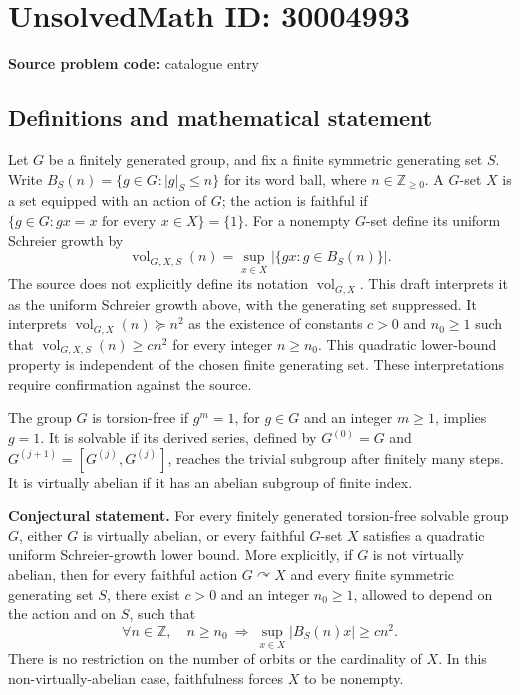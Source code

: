 \documentclass[11pt]{article}
\newcommand{\Z}{\mathbb{Z}}
\begin{document}
\section*{UnsolvedMath ID: 30004993}
\textbf{Source problem code:} catalogue entry
\subsection{Definitions and mathematical statement}
Let \(G\) be a finitely generated group, and fix a finite symmetric generating set \(S\). Write \(B_S(n)=\{g\in G:|g|_S\leq n\}\) for its word ball, where \(n\in\Z_{\geq 0}\). A \(G\)-set \(X\) is a set equipped with an action of \(G\); the action is faithful if \(\{g\in G:gx=x\text{ for every }x\in X\}=\{1\}\). For a nonempty \(G\)-set define its uniform Schreier growth by
\[
\operatorname{vol}_{G,X,S}(n)=\sup_{x\in X}\bigl|\{gx:g\in B_S(n)\}\bigr|.
\]
The source does not explicitly define its notation \(\operatorname{vol}_{G,X}\). This draft interprets it as the uniform Schreier growth above, with the generating set suppressed. It interprets \(\operatorname{vol}_{G,X}(n)\succeq n^2\) as the existence of constants \(c>0\) and \(n_0\geq 1\) such that \(\operatorname{vol}_{G,X,S}(n)\geq cn^2\) for every integer \(n\geq n_0\). This quadratic lower-bound property is independent of the chosen finite generating set. These interpretations require confirmation against the source.

The group \(G\) is torsion-free if \(g^m=1\), for \(g\in G\) and an integer \(m\geq1\), implies \(g=1\). It is solvable if its derived series, defined by \(G^{(0)}=G\) and \(G^{(j+1)}=[G^{(j)},G^{(j)}]\), reaches the trivial subgroup after finitely many steps. It is virtually abelian if it has an abelian subgroup of finite index.

\textbf{Conjectural statement.} For every finitely generated torsion-free solvable group \(G\), either \(G\) is virtually abelian, or every faithful \(G\)-set \(X\) satisfies a quadratic uniform Schreier-growth lower bound. More explicitly, if \(G\) is not virtually abelian, then for every faithful action \(G\curvearrowright X\) and every finite symmetric generating set \(S\), there exist \(c>0\) and an integer \(n_0\geq1\), allowed to depend on the action and on \(S\), such that
\[
\forall n\in\Z,\quad n\geq n_0\ \Longrightarrow\ \sup_{x\in X}|B_S(n)x|\geq cn^2.
\]
There is no restriction on the number of orbits or the cardinality of \(X\). In this non-virtually-abelian case, faithfulness forces \(X\) to be nonempty.
\end{document}
